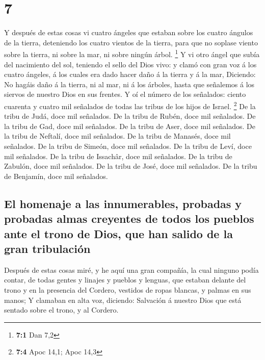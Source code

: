 \hypertarget{section-6}{%
\section{7}\label{section-6}}

 Y después de estas cosas vi cuatro ángeles que estaban
sobre los cuatro ángulos de la tierra, deteniendo los cuatro vientos de
la tierra, para que no soplase viento sobre la tierra, ni sobre la mar,
ni sobre ningún árbol. \footnote{\textbf{7:1} Dan 7,2}  Y vi
otro ángel que subía del nacimiento del sol, teniendo el sello del Dios
vivo: y clamó con gran voz á los cuatro ángeles, á los cuales era dado
hacer daño á la tierra y á la mar,  Diciendo: No hagáis daño
á la tierra, ni al mar, ni á los árboles, hasta que señalemos á los
siervos de nuestro Dios en sus frentes.  Y oí el número de
los señalados: ciento cuarenta y cuatro mil señalados de todas las
tribus de los hijos de Israel. \footnote{\textbf{7:4} Apoc 14,1; Apoc
  14,3}  De la tribu de Judá, doce mil señalados. De la
tribu de Rubén, doce mil señalados. De la tribu de Gad, doce mil
señalados.  De la tribu de Aser, doce mil señalados. De la
tribu de Neftalí, doce mil señalados. De la tribu de Manasés, doce mil
señalados.  De la tribu de Simeón, doce mil señalados. De la
tribu de Leví, doce mil señalados. De la tribu de Issachâr, doce mil
señalados.  De la tribu de Zabulón, doce mil señalados. De
la tribu de José, doce mil señalados. De la tribu de Benjamín, doce mil
señalados.

\hypertarget{el-homenaje-a-las-innumerables-probadas-y-probadas-almas-creyentes-de-todos-los-pueblos-ante-el-trono-de-dios-que-han-salido-de-la-gran-tribulaciuxf3n}{%
\subsection{El homenaje a las innumerables, probadas y probadas almas
creyentes de todos los pueblos ante el trono de Dios, que han salido de
la gran
tribulación}\label{el-homenaje-a-las-innumerables-probadas-y-probadas-almas-creyentes-de-todos-los-pueblos-ante-el-trono-de-dios-que-han-salido-de-la-gran-tribulaciuxf3n}}

 Después de estas cosas miré, y he aquí una gran compañía,
la cual ninguno podía contar, de todas gentes y linajes y pueblos y
lenguas, que estaban delante del trono y en la presencia del Cordero,
vestidos de ropas blancas, y palmas en sus manos;  Y
clamaban en alta voz, diciendo: Salvación á nuestro Dios que está
sentado sobre el trono, y al Cordero.

